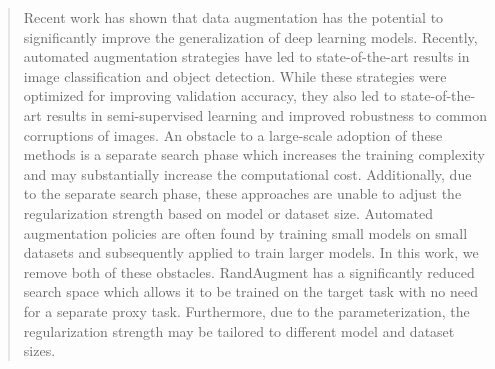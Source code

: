 \begin{abstract}
Recent work has shown that data augmentation has the potential to significantly improve the generalization of deep learning models. Recently, automated augmentation strategies have led to state-of-the-art results in image classification and object detection. While these strategies were optimized for improving validation accuracy, they also led to state-of-the-art results in semi-supervised learning and improved robustness to common corruptions of images. 
An obstacle to a large-scale adoption of these methods is a separate search phase which increases the training complexity and may substantially increase the computational cost.
Additionally, due to the separate search phase, these approaches
are unable to adjust the regularization strength based on model or dataset size. Automated augmentation policies are often found by training small models on small datasets and subsequently applied to train larger models. In this work, we remove both of these obstacles. RandAugment has a significantly reduced search space which allows it to be trained on the target task with no need for a separate proxy task.  Furthermore, due to the parameterization, the regularization strength may be tailored to different model and dataset sizes.

\end{abstract}
